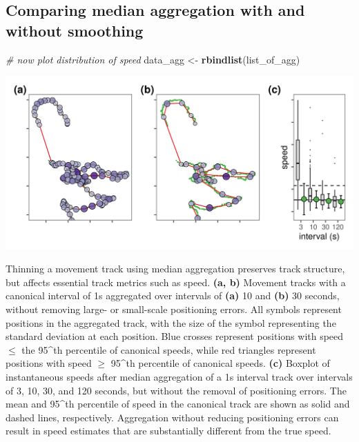 \documentclass[
]{scrreprt}
\newenvironment{Shaded}{}{}
\newcommand{\CommentTok}[1]{\textcolor[rgb]{0.38,0.63,0.69}{\textit{#1}}}
\newcommand{\KeywordTok}[1]{\textcolor[rgb]{0.00,0.44,0.13}{\textbf{#1}}}
\newcommand{\NormalTok}[1]{#1}
\newcommand{\StringTok}[1]{\textcolor[rgb]{0.25,0.44,0.63}{#1}}
\begin{document}
\hypertarget{comparing-median-aggregation-with-and-without-smoothing}{%
\subsection{Comparing median aggregation with and without smoothing}\label{comparing-median-aggregation-with-and-without-smoothing}}

\begin{Shaded}
\begin{Highlighting}[]
\CommentTok{\# now plot distribution of speed}
\NormalTok{data\_agg <{-}}\StringTok{ }\KeywordTok{rbindlist}\NormalTok{(list\_of\_agg)}
\end{Highlighting}
\end{Shaded}

\includegraphics{figures/fig_aggregate_errors.png}

Thinning a movement track using median aggregation preserves track structure, but affects essential track metrics such as speed.
\textbf{(a, b)} Movement tracks with a canonical interval of 1s aggregated over intervals of \textbf{(a)} 10 and \textbf{(b)} 30 seconds, without removing large- or small-scale positioning errors. All symbols represent positions in the aggregated track, with the size of the symbol representing the standard deviation at each position.
Blue crosses represent positions with speed \(\leq\) the 95\^{}th percentile of canonical speeds, while red triangles represent positions with speed \(\geq\) 95\^{}th percentile of canonical speeds.
\textbf{(c)} Boxplot of instantaneous speeds after median aggregation of a 1s interval track over intervals of 3, 10, 30, and 120 seconds, but without the removal of positioning errors. The mean and 95\^{}th percentile of speed in the canonical track are shown as solid and dashed lines, respectively.
Aggregation without reducing positioning errors can result in speed estimates that are substantially different from the true speed.
\end{document}
